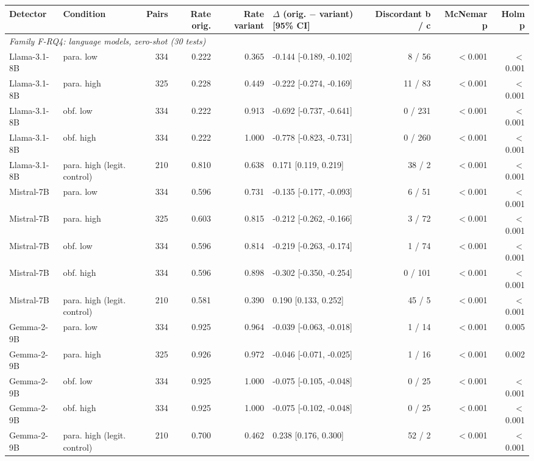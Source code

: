 \begin{tabular}{llrrrlrrr}
\toprule
Detector & Condition & Pairs & Rate orig. & Rate variant & $\Delta$ (orig. $-$ variant) [95\% CI] & Discordant b / c & McNemar p & Holm p \\
\midrule
\multicolumn{9}{l}{\textit{Family F-RQ4: language models, zero-shot (30 tests)}} \\
Llama-3.1-8B & para. low & 334 & 0.222 & 0.365 & -0.144 [-0.189, -0.102] & 8 / 56 & $<$0.001 & $<$0.001 \\
Llama-3.1-8B & para. high & 325 & 0.228 & 0.449 & -0.222 [-0.274, -0.169] & 11 / 83 & $<$0.001 & $<$0.001 \\
Llama-3.1-8B & obf. low & 334 & 0.222 & 0.913 & -0.692 [-0.737, -0.641] & 0 / 231 & $<$0.001 & $<$0.001 \\
Llama-3.1-8B & obf. high & 334 & 0.222 & 1.000 & -0.778 [-0.823, -0.731] & 0 / 260 & $<$0.001 & $<$0.001 \\
Llama-3.1-8B & para. high (legit. control) & 210 & 0.810 & 0.638 & 0.171 [0.119, 0.219] & 38 / 2 & $<$0.001 & $<$0.001 \\
Mistral-7B & para. low & 334 & 0.596 & 0.731 & -0.135 [-0.177, -0.093] & 6 / 51 & $<$0.001 & $<$0.001 \\
Mistral-7B & para. high & 325 & 0.603 & 0.815 & -0.212 [-0.262, -0.166] & 3 / 72 & $<$0.001 & $<$0.001 \\
Mistral-7B & obf. low & 334 & 0.596 & 0.814 & -0.219 [-0.263, -0.174] & 1 / 74 & $<$0.001 & $<$0.001 \\
Mistral-7B & obf. high & 334 & 0.596 & 0.898 & -0.302 [-0.350, -0.254] & 0 / 101 & $<$0.001 & $<$0.001 \\
Mistral-7B & para. high (legit. control) & 210 & 0.581 & 0.390 & 0.190 [0.133, 0.252] & 45 / 5 & $<$0.001 & $<$0.001 \\
Gemma-2-9B & para. low & 334 & 0.925 & 0.964 & -0.039 [-0.063, -0.018] & 1 / 14 & $<$0.001 & 0.005 \\
Gemma-2-9B & para. high & 325 & 0.926 & 0.972 & -0.046 [-0.071, -0.025] & 1 / 16 & $<$0.001 & 0.002 \\
Gemma-2-9B & obf. low & 334 & 0.925 & 1.000 & -0.075 [-0.105, -0.048] & 0 / 25 & $<$0.001 & $<$0.001 \\
Gemma-2-9B & obf. high & 334 & 0.925 & 1.000 & -0.075 [-0.102, -0.048] & 0 / 25 & $<$0.001 & $<$0.001 \\
Gemma-2-9B & para. high (legit. control) & 210 & 0.700 & 0.462 & 0.238 [0.176, 0.300] & 52 / 2 & $<$0.001 & $<$0.001 \\

\end{tabular}
